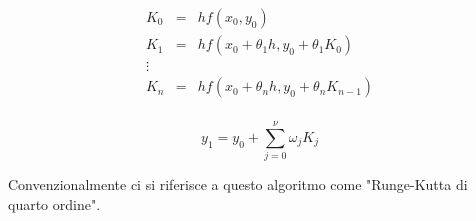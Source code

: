 \documentclass[11pt]{article}
\begin{document}
\begin{displaymath}
	\begin{array}{rcl}
				K_{0} & = & h f(x_{0} , y_{0}) \\
				K_{1} & = & h f(x_{0} + \theta_{1} h , y_{0} + \theta_{1} K_{0}) \\
				\vdots \\
				K_{n} & = & h f(x_{0} + \theta_{n} h , y_{0} + \theta_{n} K_{n-1}) \\
	\end{array}
\end{displaymath}

	\begin{equation}
	y_{1} = y_{0} + \sum_{j=0}^{\nu}\omega_{j}K_{j}
	\end{equation}

Convenzionalmente ci si riferisce a questo algoritmo come "Runge-Kutta di quarto ordine".
 
\end{document}
